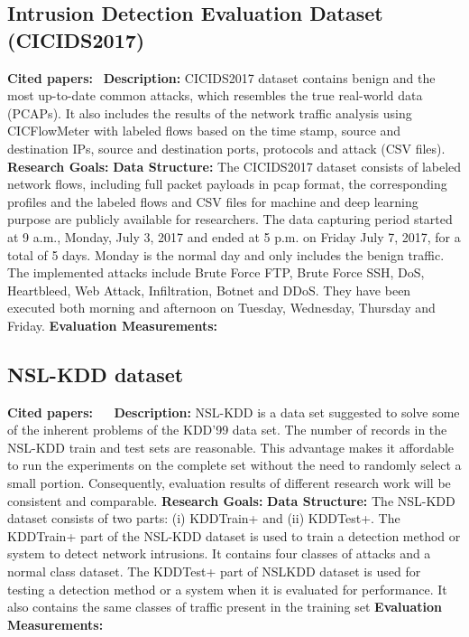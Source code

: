 \subsection{Intrusion Detection Evaluation Dataset (CICIDS2017)}
\textbf{Cited papers:}~\cite{sharafaldin2018toward} \newline
\textbf{Description:} CICIDS2017 dataset contains benign and the most up-to-date common attacks, which resembles the true real-world data (PCAPs). It also includes the results of the network traffic analysis using CICFlowMeter with labeled flows based on the time stamp, source and destination IPs, source and destination ports, protocols and attack (CSV files). \newline
\textbf{Research Goals:}  \newline
\textbf{Data Structure:} The CICIDS2017 dataset consists of labeled network flows, including full packet payloads in pcap format, the corresponding profiles and the labeled flows and CSV files for machine and deep learning purpose are publicly available for researchers. The data capturing period started at 9 a.m., Monday, July 3, 2017 and ended at 5 p.m. on Friday July 7, 2017, for a total of 5 days. Monday is the normal day and only includes the benign traffic. The implemented attacks include Brute Force FTP, Brute Force SSH, DoS, Heartbleed, Web Attack, Infiltration, Botnet and DDoS. They have been executed both morning and afternoon on Tuesday, Wednesday, Thursday and Friday.\newline
\textbf{Evaluation Measurements:} \newline




\subsection{NSL-KDD dataset}
\textbf{Cited papers:}~\cite{tavallaee2009detailed} ~\cite{bhuyan2015towards}\newline
\textbf{Description:} NSL-KDD is a data set suggested to solve some of the inherent problems of the KDD'99 data set. The number of records in the NSL-KDD train and test sets are reasonable. This advantage makes it affordable to run the experiments on the complete set without the need to randomly select a small portion. Consequently, evaluation results of different research work will be consistent and comparable. \newline
\textbf{Research Goals:}  \newline
\textbf{Data Structure:} The NSL-KDD dataset consists of two parts: (i) KDDTrain+ and (ii) KDDTest+. The KDDTrain+ part of the NSL-KDD dataset is used to train a detection method or system to detect network intrusions. It contains four classes of attacks and a normal class dataset. The KDDTest+ part of NSLKDD dataset is used for testing a detection method or a system
when it is evaluated for performance. It also contains the same classes of traffic present in the training set \newline
\textbf{Evaluation Measurements:} \newline





